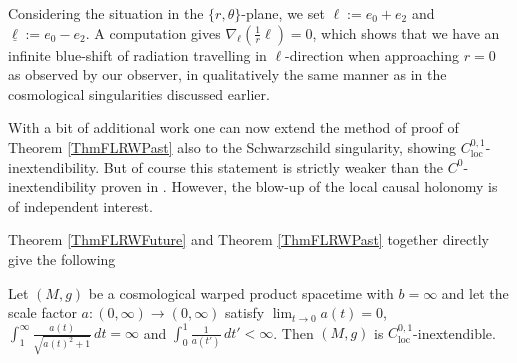 \documentclass[reqno]{article}
\newcommand{\loc}{\mathrm{loc}}
\begin{document}
\begin{remark}
Considering the situation in the $\{r,\theta\}$-plane, we set $\ell := e_0 + e_2$ and $\underline{\ell} := e_0 - e_2$. A computation gives $\nabla_\ell (\frac{1}{r} \ell) = 0$, which shows that we have an infinite blue-shift of radiation travelling in $\ell$-direction when approaching $r=0$ as observed by our observer, in qualitatively the same manner as in the cosmological singularities discussed earlier.

With a bit of additional work one can now extend the method of proof of Theorem \ref{ThmFLRWPast} also to the Schwarzschild singularity, showing $C^{0,1}_{\loc}$-inextendibility. But of course this statement is strictly weaker than the $C^0$-inextendibility proven in \cite{Sbie15}. However, the blow-up of the local causal holonomy is of independent interest.
\end{remark}

Theorem \ref{ThmFLRWFuture} and Theorem \ref{ThmFLRWPast} together directly give the following
\begin{corollary} \label{CorFLRW}
Let $(M,g)$ be a cosmological warped product spacetime with $b=\infty$ and let the scale factor $ a : (0,\infty) \to (0,\infty)$ satisfy  $\lim_{t \to 0} a(t) = 0$, $\int_1^\infty \frac{a(t)}{ \sqrt{a(t)^2 + 1}}\, dt = \infty$ and $\int_0^1 \frac{1}{a(t')} \, dt' < \infty$. Then $(M,g)$ is $C^{0,1}_{\loc}$-inextendible.
\end{corollary}
\end{document}
